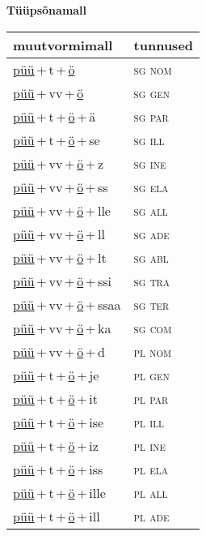 
\vspace{1.8em}
\begin{minipage}{\textwidth}
\textbf{Tüüpsõnamall \,}\\

\begin{sideways}
\begin{tabular}{l l}
muutvormimall & tunnused \\
\hline
\underline{püü}\,+\,t\,+\,\underline{ö} & \textsc{ sg nom } \\
\underline{püü}\,+\,vv\,+\,\underline{ö} & \textsc{ sg gen } \\
\underline{püü}\,+\,t\,+\,\underline{ö}\,+\,ä & \textsc{ sg par } \\
\underline{püü}\,+\,t\,+\,\underline{ö}\,+\,se & \textsc{ sg ill } \\
\underline{püü}\,+\,vv\,+\,\underline{ö}\,+\,z & \textsc{ sg ine } \\
\underline{püü}\,+\,vv\,+\,\underline{ö}\,+\,ss & \textsc{ sg ela } \\
\underline{püü}\,+\,vv\,+\,\underline{ö}\,+\,lle & \textsc{ sg all } \\
\underline{püü}\,+\,vv\,+\,\underline{ö}\,+\,ll & \textsc{ sg ade } \\
\underline{püü}\,+\,vv\,+\,\underline{ö}\,+\,lt & \textsc{ sg abl } \\
\underline{püü}\,+\,vv\,+\,\underline{ö}\,+\,ssi & \textsc{ sg tra } \\
\underline{püü}\,+\,vv\,+\,\underline{ö}\,+\,ssaa & \textsc{ sg ter } \\
\underline{püü}\,+\,vv\,+\,\underline{ö}\,+\,ka & \textsc{ sg com } \\
\underline{püü}\,+\,vv\,+\,\underline{ö}\,+\,d & \textsc{ pl nom } \\
\underline{püü}\,+\,t\,+\,\underline{ö}\,+\,je & \textsc{ pl gen } \\
\underline{püü}\,+\,t\,+\,\underline{ö}\,+\,it & \textsc{ pl par } \\
\underline{püü}\,+\,t\,+\,\underline{ö}\,+\,ise & \textsc{ pl ill } \\
\underline{püü}\,+\,t\,+\,\underline{ö}\,+\,iz & \textsc{ pl ine } \\
\underline{püü}\,+\,t\,+\,\underline{ö}\,+\,iss & \textsc{ pl ela } \\
\underline{püü}\,+\,t\,+\,\underline{ö}\,+\,ille & \textsc{ pl all } \\
\underline{püü}\,+\,t\,+\,\underline{ö}\,+\,ill & \textsc{ pl ade } \\

\end{tabular}
\end{sideways}
\end{minipage}
